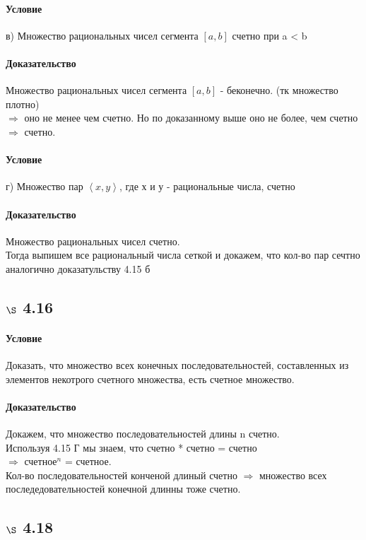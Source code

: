 \documentclass[a4paper,12pt]{article}
\begin{document}
\paragraph*{Условие}
в) Множество рациональных чисел сегмента $\left[ a, b\right] $ счетно при a < b
\paragraph*{Доказательство}
Множество рациональных чисел сегмента $\left[ a, b\right] $ - беконечно. (тк множество плотно)\\
$\Rightarrow$ оно не менее чем счетно. Но по доказанному выше оно не более, чем счетно $\Rightarrow$ счетно.
\paragraph*{Условие}
г) Множество пар $ \left\langle  x, y \right\rangle $, где х и у - рациональные числа, счетно
\paragraph*{Доказательство}
Множество рациональных чисел счетно.\\
Тогда выпишем все рациональный числа сеткой и докажем, что кол-во пар сечтно аналогично доказатульству 4.15 б\\

\subsection*{$\S$ 4.16}
\paragraph*{Условие}
Доказать, что множество всех конечных последовательностей, составленных из элементов некотрого счетного множества, есть счетное множество.
\paragraph*{Доказательство}
Докажем, что множество последовательностей длины n счетно.\\
Используя 4.15 Г мы знаем, что счетно * счетно = счетно \\
$ \Rightarrow $ счетное$^{n} $ = счетное.\\
Кол-во последовательностей конченой длиный счетно $\Rightarrow$ множество всех последедовательностей конечной длинны тоже счетно.


\subsection*{$\S$ 4.18}
\end{document}
